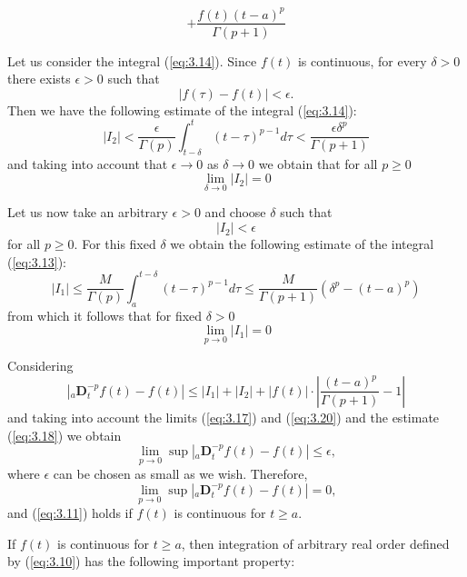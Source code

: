 \documentclass[a4paper,14pt,oneside]{book}
\theoremstyle{plain}
\theoremstyle{definition}
\theoremstyle{remark}
\begin{document}
\begin{center}
\begin{flushleft}
\begin{equation}
\end{equation}
\begin{equation}\label{eq:3.15}
+\frac{f(t)(t-a)^{p}}{\Gamma(p+1)}
\end{equation}
\par Let us consider the integral (\ref{eq:3.14}). Since $f(t)$ is continuous, for every $\delta>0$ there exists $\epsilon>0$ such that
$$
|f(\tau)-f(t)|<\epsilon .
$$
Then we have the following estimate of the integral (\ref{eq:3.14}):
\begin{equation}\label{eq:3.16}
\left|I_{2}\right|<\frac{\epsilon}{\Gamma(p)} \int_{t-\delta}^{t}(t-\tau)^{p-1} d \tau<\frac{\epsilon \delta^{p}}{\Gamma(p+1)}
\end{equation}
and taking into account that $\epsilon \rightarrow 0$ as $\delta \rightarrow 0$ we obtain that for all $p \geq 0$
\begin{equation}\label{eq:3.17}
\lim _{\delta \rightarrow 0}\left|I_{2}\right|=0
\end{equation}
\par Let us now take an arbitrary $\epsilon>0$ and choose $\delta$ such that
\begin{equation}\label{eq:3.18}
\left|I_{2}\right|<\epsilon
\end{equation}
for all $p \geq 0$. For this fixed $\delta$ we obtain the following estimate of the integral (\ref{eq:3.13}):
\begin{equation}\label{eq:3.19}
\left|I_{1}\right| \leq \frac{M}{\Gamma(p)} \int_{a}^{t-\delta}(t-\tau)^{p-1} d \tau \leq \frac{M}{\Gamma(p+1)}\left(\delta^{p}-(t-a)^{p}\right)
\end{equation}
from which it follows that for fixed $\delta>0$
\begin{equation}\label{eq:3.20}
\lim _{p \rightarrow 0}\left|I_{1}\right|=0
\end{equation}
\par Considering
$$
\left|{ }_{a} \mathbf{D}_{t}^{-p} f(t)-f(t)\right| \leq\left|I_{1}\right|+\left|I_{2}\right|+|f(t)| \cdot\left|\frac{(t-a)^{p}}{\Gamma(p+1)}-1\right|
$$
and taking into account the limits (\ref{eq:3.17}) and (\ref{eq:3.20}) and the estimate (\ref{eq:3.18}) we obtain
$$
\lim _{p \rightarrow 0} \sup \left|{ }_{a} \mathbf{D}_{t}^{-p} f(t)-f(t)\right| \leq \epsilon,
$$
where $\epsilon$ can be chosen as small as we wish. Therefore,
$$
\lim _{p \rightarrow 0} \sup \left|{ }_{a} \mathbf{D}_{t}^{-p} f(t)-f(t)\right|=0,
$$
and (\ref{eq:3.11}) holds if $f(t)$ is continuous for $t \geq a$.
\par If $f(t)$ is continuous for $t \geq a$, then integration of arbitrary real order defined by (\ref{eq:3.10}) has the following important property:

\end{flushleft}
\end{center}
\end{document}
